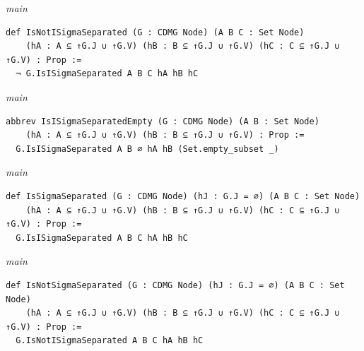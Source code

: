 {\small\textit{main}}
\begin{verbatim}
def IsNotISigmaSeparated (G : CDMG Node) (A B C : Set Node)
    (hA : A ⊆ ↑G.J ∪ ↑G.V) (hB : B ⊆ ↑G.J ∪ ↑G.V) (hC : C ⊆ ↑G.J ∪ ↑G.V) : Prop :=
  ¬ G.IsISigmaSeparated A B C hA hB hC
\end{verbatim}
{\small\textit{main}}
\begin{verbatim}
abbrev IsISigmaSeparatedEmpty (G : CDMG Node) (A B : Set Node)
    (hA : A ⊆ ↑G.J ∪ ↑G.V) (hB : B ⊆ ↑G.J ∪ ↑G.V) : Prop :=
  G.IsISigmaSeparated A B ∅ hA hB (Set.empty_subset _)
\end{verbatim}
{\small\textit{main}}
\begin{verbatim}
def IsSigmaSeparated (G : CDMG Node) (hJ : G.J = ∅) (A B C : Set Node)
    (hA : A ⊆ ↑G.J ∪ ↑G.V) (hB : B ⊆ ↑G.J ∪ ↑G.V) (hC : C ⊆ ↑G.J ∪ ↑G.V) : Prop :=
  G.IsISigmaSeparated A B C hA hB hC
\end{verbatim}
{\small\textit{main}}
\begin{verbatim}
def IsNotSigmaSeparated (G : CDMG Node) (hJ : G.J = ∅) (A B C : Set Node)
    (hA : A ⊆ ↑G.J ∪ ↑G.V) (hB : B ⊆ ↑G.J ∪ ↑G.V) (hC : C ⊆ ↑G.J ∪ ↑G.V) : Prop :=
  G.IsNotISigmaSeparated A B C hA hB hC
\end{verbatim}
~%

\vspace{\appendixNotesGap}

